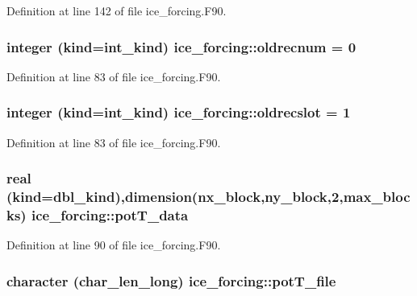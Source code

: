 Definition at line 142 of file ice\_\-forcing.F90.\hypertarget{namespaceice__forcing_ad802bdcf2b496e0e3b0cf226abe288ec}{
\subsubsection[{oldrecnum}]{\setlength{\rightskip}{0pt plus 5cm}integer (kind=int\_\-kind) {\bf ice\_\-forcing::oldrecnum} = 0}}
\label{namespaceice__forcing_ad802bdcf2b496e0e3b0cf226abe288ec}


Definition at line 83 of file ice\_\-forcing.F90.\hypertarget{namespaceice__forcing_abf29b2295f18d12d51a4d993a2589770}{
\subsubsection[{oldrecslot}]{\setlength{\rightskip}{0pt plus 5cm}integer (kind=int\_\-kind) {\bf ice\_\-forcing::oldrecslot} = 1}}
\label{namespaceice__forcing_abf29b2295f18d12d51a4d993a2589770}


Definition at line 83 of file ice\_\-forcing.F90.\hypertarget{namespaceice__forcing_a8be75ef0261c9c45a8a2b4983813d2ea}{
\subsubsection[{potT\_\-data}]{\setlength{\rightskip}{0pt plus 5cm}real (kind=dbl\_\-kind),dimension(nx\_\-block,ny\_\-block,2,max\_\-blocks) {\bf ice\_\-forcing::potT\_\-data}}}
\label{namespaceice__forcing_a8be75ef0261c9c45a8a2b4983813d2ea}


Definition at line 90 of file ice\_\-forcing.F90.\hypertarget{namespaceice__forcing_aa081200ee80895fd9ca58398d4171467}{
\subsubsection[{potT\_\-file}]{\setlength{\rightskip}{0pt plus 5cm}character (char\_\-len\_\-long) {\bf ice\_\-forcing::potT\_\-file}}}
\label{namespaceice__forcing_aa081200ee80895fd9ca58398d4171467}


